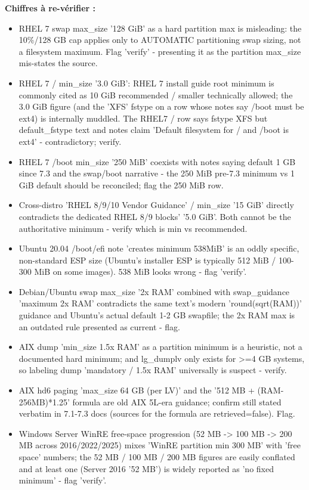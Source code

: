 \documentclass[10pt,a4paper]{article}
\begin{document}
\noindent\textbf{Chiffres à re-v\'erifier :}
\begin{itemize}[leftmargin=1.6em]
\item RHEL 7 swap max\_size '128 GiB' as a hard partition max is misleading: the 10\%/128 GB cap applies only to AUTOMATIC partitioning swap sizing, not a filesystem maximum. Flag 'verify' - presenting it as the partition max\_size mis-states the source.
\item RHEL 7 / min\_size '3.0 GiB': RHEL 7 install guide root minimum is commonly cited as 10 GiB recommended / smaller technically allowed; the 3.0 GiB figure (and the 'XFS' fstype on a row whose notes say /boot must be ext4) is internally muddled. The RHEL7 / row says fstype XFS but default\_fstype text and notes claim 'Default filesystem for / and /boot is ext4' - contradictory; verify.
\item RHEL 7 /boot min\_size '250 MiB' coexists with notes saying default 1 GB since 7.3 and the swap/boot narrative - the 250 MiB pre-7.3 minimum vs 1 GiB default should be reconciled; flag the 250 MiB row.
\item Cross-distro 'RHEL 8/9/10 Vendor Guidance' / min\_size '15 GiB' directly contradicts the dedicated RHEL 8/9 blocks' '5.0 GiB'. Both cannot be the authoritative minimum - verify which is min vs recommended.
\item Ubuntu 20.04 /boot/efi note 'creates minimum 538MiB' is an oddly specific, non-standard ESP size (Ubuntu's installer ESP is typically 512 MiB / 100-300 MiB on some images). 538 MiB looks wrong - flag 'verify'.
\item Debian/Ubuntu swap max\_size '2x RAM' combined with swap\_guidance 'maximum 2x RAM' contradicts the same text's modern 'round(sqrt(RAM))' guidance and Ubuntu's actual default 1-2 GB swapfile; the 2x RAM max is an outdated rule presented as current - flag.
\item AIX dump 'min\_size 1.5x RAM' as a partition minimum is a heuristic, not a documented hard minimum; and lg\_dumplv only exists for >=4 GB systems, so labeling dump 'mandatory / 1.5x RAM' universally is suspect - verify.
\item AIX hd6 paging 'max\_size 64 GB (per LV)' and the '512 MB + (RAM-256MB)*1.25' formula are old AIX 5L-era guidance; confirm still stated verbatim in 7.1-7.3 docs (sources for the formula are retrieved=false). Flag.
\item Windows Server WinRE free-space progression (52 MB -> 100 MB -> 200 MB across 2016/2022/2025) mixes 'WinRE partition min 300 MB' with 'free space' numbers; the 52 MB / 100 MB / 200 MB figures are easily conflated and at least one (Server 2016 '52 MB') is widely reported as 'no fixed minimum' - flag 'verify'.

\end{itemize}
\end{document}
